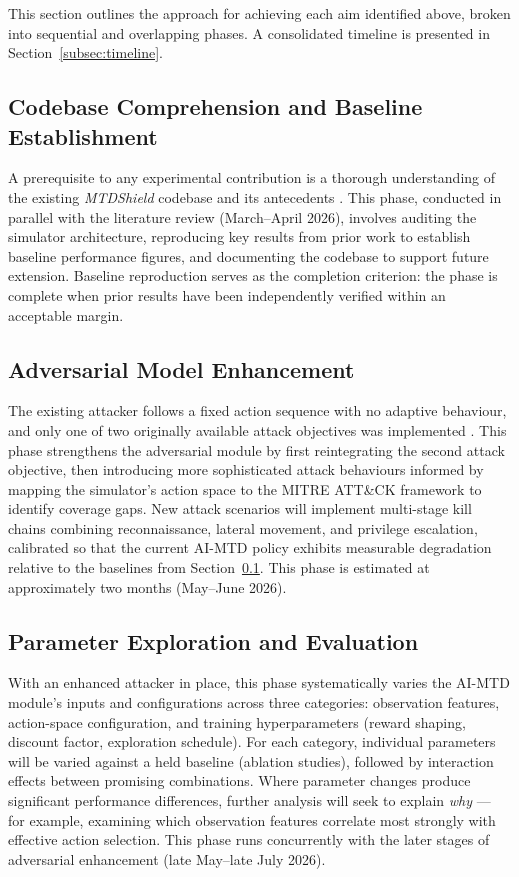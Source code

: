 \documentclass[11pt, a4paper]{article}
\begin{document}
This section outlines the approach for achieving each aim identified above, broken into sequential and overlapping phases. A consolidated timeline is presented in Section~\ref{subsec:timeline}.

\subsection{Codebase Comprehension and Baseline Establishment}\label{subsec:baseline}

A prerequisite to any experimental contribution is a thorough
understanding of the existing \textit{MTDShield} codebase and its
antecedents \cite{zhang2023, tay2024}. This phase, conducted in parallel
with the literature review (March--April 2026), involves auditing the
simulator architecture, reproducing key results from prior work to
establish baseline performance figures, and documenting the codebase to
support future extension. Baseline reproduction serves as the completion
criterion: the phase is complete when prior results have been independently
verified within an acceptable margin.

\subsection{Adversarial Model Enhancement}

The existing attacker follows a fixed action sequence with no adaptive
behaviour, and only one of two originally available attack objectives was
implemented \cite{zhang2023}. This phase strengthens the adversarial module
by first reintegrating the second attack objective, then introducing more
sophisticated attack behaviours informed by mapping the simulator's action
space to the MITRE ATT\&CK framework to identify coverage gaps. New attack
scenarios will implement multi-stage kill chains combining reconnaissance,
lateral movement, and privilege escalation, calibrated so that the current
AI-MTD policy exhibits measurable degradation relative to the baselines
from Section~\ref{subsec:baseline}. This phase is estimated at
approximately two months (May--June 2026).

\subsection{Parameter Exploration and Evaluation}\label{subsec:param}

With an enhanced attacker in place, this phase systematically varies the
AI-MTD module's inputs and configurations across three categories:
observation features, action-space configuration, and training
hyperparameters (reward shaping, discount factor, exploration schedule).
For each category, individual parameters will be varied against a held
baseline (ablation studies), followed by interaction effects between
promising combinations. Where parameter changes produce significant
performance differences, further analysis will seek to explain
\textit{why} --- for example, examining which observation features
correlate most strongly with effective action selection. This phase runs
concurrently with the later stages of adversarial enhancement (late
May--late July 2026).
\end{document}
